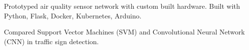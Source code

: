 \documentclass[]{deedy-resume-openfont}
\begin{document}
\hfill{}

\vspace{-4pt}
\begin{tightemize}%

\item Prototyped air quality sensor network with custom built hardware. Built with Python, Flask, Docker, Kubernetes, Arduino.
\item Compared Support Vector Machines (SVM) and Convolutional Neural Network (CNN) in traffic sign detection.


\end{tightemize}
\sectionsep






\end{document}
